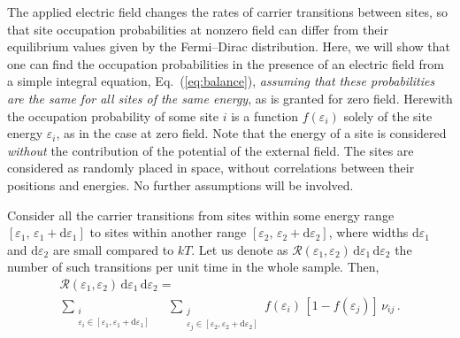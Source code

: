 \documentclass[aps,reprint,amsmath,amssymb,superscriptaddress,showpacs,prb]{revtex4-1}
\newcommand{\ve}{\varepsilon}
\begin{document}
The applied electric field changes the rates of carrier transitions between sites, so that site occupation probabilities at nonzero field can differ from their equilibrium values given by the Fermi--Dirac distribution. Here, we will show that one can find the occupation probabilities in the presence of an electric field from a simple integral equation, Eq.~(\ref{eq:balance}), \emph{assuming that these probabilities are the same for all sites of the same energy}, as is granted for zero field. Herewith the occupation probability of some site $i$ is a function $f(\ve_i)$ solely of the site energy $\ve_i$, as in the case at zero field. Note that the energy of a site is considered \emph{without} the contribution of the potential of the external field. The sites are considered as randomly placed in space, without correlations between their positions and energies. No further assumptions will be involved.

Consider all the carrier transitions from sites within some energy range $[\ve_1, \, \ve_1+\mathrm{d}\ve_1]$ to sites within another range $[\ve_2, \, \ve_2+\mathrm{d}\ve_2]$, where widths $\mathrm{d}\ve_1$ and $\mathrm{d}\ve_2$ are small compared to $kT$. Let us denote as $\mathcal{R}(\ve_1,\ve_2) \, \mathrm{d}\ve_1 \, \mathrm{d}\ve_2$ the number of such transitions per unit time in the whole sample. Then,
\begin{multline}
	\label{eq:rate-from-to}
	\mathcal{R}(\ve_1,\ve_2) \, \mathrm{d}\ve_1 \, \mathrm{d}\ve_2 = \\
	\sum\limits_{\substack{i \\ \ve_i \in [\ve_1, \ve_1+\mathrm{d}\ve_1]}} \quad
	\sum\limits_{\substack{j \\ \ve_j \in [\ve_2, \ve_2+\mathrm{d}\ve_2]}}
	f(\ve_i) \, [1-f(\ve_j)] \, \nu_{ij} \, .
\end{multline}
\end{document}
